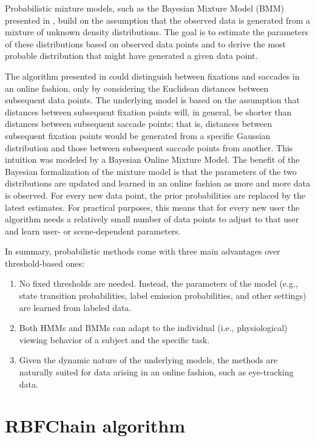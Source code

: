 \documentclass[preprint,12pt]{elsarticle}
\begin{document}
Probabilistic mixture models, such as the Bayesian Mixture Model (BMM) presented in \cite{Tafaj:2012:BOC:2168556.2168617},
build on the assumption that the observed data is generated from a mixture of unknown density distributions.
The goal is to estimate the parameters of these distributions based on observed data points and to derive the most probable distribution that might have generated a given data point.

The algorithm presented in \cite{Tafaj:2012:BOC:2168556.2168617} could distinguish between fixations and saccades in an online fashion,
only by considering the Euclidean distances between subsequent data points.
The underlying model is based on the assumption
that distances between subsequent fixation points will, in general, be shorter than distances between subsequent saccade points;
that is, distances between subsequent fixation points would be generated from a specific Gaussian distribution and those between subsequent saccade points from another.
This intuition was modeled by a Bayesian Online Mixture Model.
The benefit of the Bayesian formalization of the mixture model
is that the parameters of the two distributions are updated and learned in an online fashion as more and more data is observed.
For every new data point, the prior probabilities are replaced by the latest estimates.
For practical purposes, this means that for every new user the algorithm needs a relatively small number of data points to
adjust to that user and learn user- or scene-dependent parameters.

In summary, probabilistic methods come with three main advantages over threshold-based ones:

\begin{enumerate}
    \item No fixed thresholds are needed. Instead, the parameters of the model (e.g., state transition probabilities, label emission probabilities, and other settings) are learned from labeled data.
    \item Both HMMs and BMMs can adapt to the individual (i.e., physiological) viewing behavior of a subject and the specific task.
    \item Given the dynamic nature of the underlying models, the methods are naturally suited for data arising in an online fashion, such as eye-tracking data.
\end{enumerate}

\section{RBFChain algorithm}
\label{sec:rbfchain_algorithm}
\end{document}
